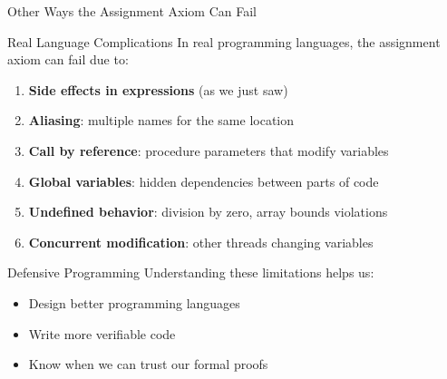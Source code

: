 \begin{frame}{Other Ways the Assignment Axiom Can Fail}
    \begin{block}{Real Language Complications}
        In real programming languages, the assignment axiom can fail due to:
        \begin{enumerate}
            \item \textbf{Side effects in expressions} (as we just saw)
            \item \textbf{Aliasing}: multiple names for the same location
            \item \textbf{Call by reference}: procedure parameters that modify variables
            \item \textbf{Global variables}: hidden dependencies between parts of code
            \item \textbf{Undefined behavior}: division by zero, array bounds violations
            \item \textbf{Concurrent modification}: other threads changing variables
        \end{enumerate}
    \end{block}
    
    \begin{block}{Defensive Programming}
        Understanding these limitations helps us:
        \begin{itemize}
            \item Design better programming languages
            \item Write more verifiable code
            \item Know when we can trust our formal proofs
        \end{itemize}
    \end{block}
\end{frame}

